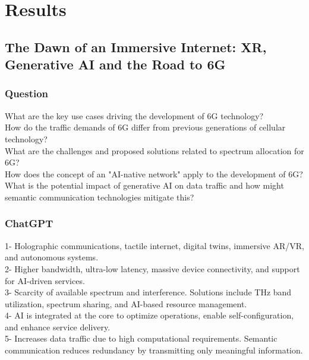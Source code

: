 \section{Results}

\subsection{The Dawn of an Immersive Internet: XR, Generative AI and the Road to 6G}
\subsubsection{Question}
\begin{tcolorbox}[breakable]
What are the key use cases driving the development of 6G technology?\\
How do the traffic demands of 6G differ from previous generations of cellular technology?\\
What are the challenges and proposed solutions related to spectrum allocation for 6G?\\
How does the concept of an "AI-native network" apply to the development of 6G?\\
What is the potential impact of generative AI on data traffic and how might semantic communication technologies mitigate this?\\

\end{tcolorbox}
\subsubsection{ChatGPT}
\begin{tcolorbox}[breakable]
    1- Holographic communications, tactile internet, digital twins, immersive AR/VR, and autonomous systems.\\
2- Higher bandwidth, ultra-low latency, massive device connectivity, and support for AI-driven services.\\
3- Scarcity of available spectrum and interference. Solutions include THz band utilization, spectrum sharing, and AI-based resource management.\\
4- AI is integrated at the core to optimize operations, enable self-configuration, and enhance service delivery.\\
5- Increases data traffic due to high computational requirements. Semantic communication reduces redundancy by transmitting only meaningful information.\\

\end{tcolorbox}
